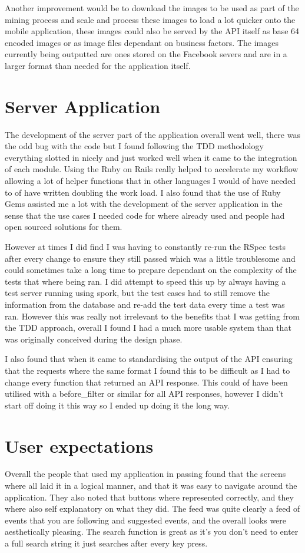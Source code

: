 	Another improvement would be to download the images to be used as part of the mining process and scale and process these images to load a lot quicker onto the mobile application, these images could also be served by the API itself as base 64 encoded images or as image files dependant on business factors.  The images currently being outputted are ones stored on the Facebook severs and are in a larger format than needed for the application itself. 

\section{Server Application}
	The development of the server part of the application overall went well, there was the odd bug with the code but I found following the TDD methodology everything slotted in nicely and just worked well when it came to the integration of each module. Using the Ruby on Rails really helped to accelerate my workflow allowing a lot of helper functions that in other languages I would of have needed to of have written doubling the work load. I also found that the use of Ruby Gems assisted me a lot with the development of the server application in the sense that the use cases I needed code for where already used and people had open sourced solutions for them. 

	However at times I did find I was having to constantly re-run the RSpec tests after every change to ensure they still passed which was a little troublesome and could sometimes take a long time to prepare dependant on the complexity of the tests that where being ran. I did attempt to speed this up by always having a test server running using spork, but the test cases had to still remove the information from the database and re-add the test data every time a test was ran. However this was really not irrelevant to the benefits that I was getting from the TDD approach, overall I found I had a much more usable system than that was originally conceived during the design phase. 

	I also found that when it came to standardising the output of the API ensuring that the requests where the same format I found this to be difficult as I had to change every function that returned an API response. This could of have been utilised with a before\_filter or similar for all API responses, however I didn't start off doing it this way so I ended up doing it the long way. 

\section{User expectations}
	Overall the people that used my application in passing found that the screens where all laid it in a logical manner, and that it was easy to navigate around the application. They also noted that buttons where represented correctly, and they where also self explanatory on what they did. The feed was quite clearly a feed of events that you are following and suggested events, and the overall looks were aesthetically pleasing. The search function is great as it's you don't need to enter a full search string it just searches after every key press. 

